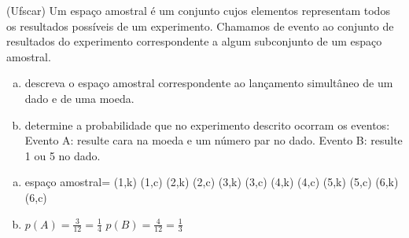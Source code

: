 \begin{ex}
(Ufscar) Um espaço amostral é um conjunto cujos elementos representam todos os resultados possíveis de um experimento. Chamamos de evento ao conjunto de resultados do experimento correspondente a algum subconjunto de um espaço amostral.
   \begin{enumerate}[(a)]
   \item descreva o espaço amostral correspondente ao lançamento simultâneo de um dado e de uma moeda.
   \item determine a probabilidade que no experimento descrito ocorram os eventos:
   Evento A: resulte cara na moeda e um número par no dado.
   Evento B: resulte 1 ou 5 no dado.
   \end{enumerate}
     \begin{sol}
      \phantom{A}
        \begin{enumerate} [(a)]
            \item espaço amostral= (1,k) (1,c) (2,k) (2,c) (3,k) (3,c) (4,k) (4,c) (5,k) (5,c) (6,k) (6,c)
            \item $p(A)=\frac{3}{12}=\frac{1}{4}$\hspace{0,6cm} $p(B)=\frac{4}{12}=\frac{1}{3}$
        \end{enumerate}
     \end{sol}
\end{ex}